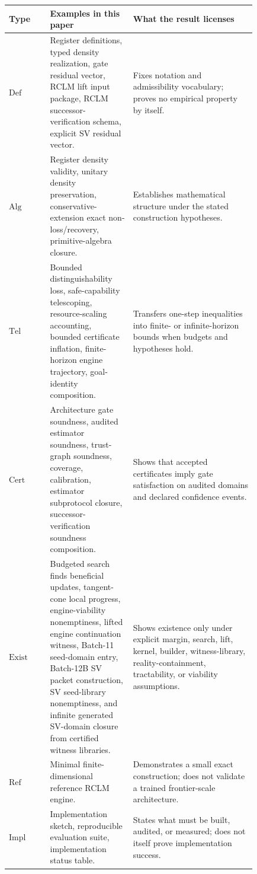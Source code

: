 \documentclass[11pt,a4paper]{article}
\begin{document}
\begin{longtable}{p{0.14\linewidth}p{0.27\linewidth}p{0.42\linewidth}}
\toprule
\textbf{Type} & \textbf{Examples in this paper} & \textbf{What the result licenses}\\
\midrule
\endhead
\bottomrule
\endlastfoot
\(\mathrm{Def}\) & Register definitions, typed density realization, gate residual vector, RCLM lift input package, RCLM successor-verification schema, explicit SV residual vector. & Fixes notation and admissibility vocabulary; proves no empirical property by itself.\\
\(\mathrm{Alg}\) & Register density validity, unitary density preservation, conservative-extension exact non-loss/recovery, primitive-algebra closure. & Establishes mathematical structure under the stated construction hypotheses.\\
\(\mathrm{Tel}\) & Bounded distinguishability loss, safe-capability telescoping, resource-scaling accounting, bounded certificate inflation, finite-horizon engine trajectory, goal-identity composition. & Transfers one-step inequalities into finite- or infinite-horizon bounds when budgets and hypotheses hold.\\
\(\mathrm{Cert}\) & Architecture gate soundness, audited estimator soundness, trust-graph soundness, coverage, calibration, estimator subprotocol closure, successor-verification soundness composition. & Shows that accepted certificates imply gate satisfaction on audited domains and declared confidence events.\\
\(\mathrm{Exist}\) & Budgeted search finds beneficial updates, tangent-cone local progress, engine-viability nonemptiness, lifted engine continuation witness, Batch-11 seed-domain entry, Batch-12B SV packet construction, SV seed-library nonemptiness, and infinite generated SV-domain closure from certified witness libraries. & Shows existence only under explicit margin, search, lift, kernel, builder, witness-library, reality-containment, tractability, or viability assumptions.\\
\(\mathrm{Ref}\) & Minimal finite-dimensional reference RCLM engine. & Demonstrates a small exact construction; does not validate a trained frontier-scale architecture.\\
\(\mathrm{Impl}\) & Implementation sketch, reproducible evaluation suite, implementation status table. & States what must be built, audited, or measured; does not itself prove implementation success.\\
\end{longtable}
\end{document}
